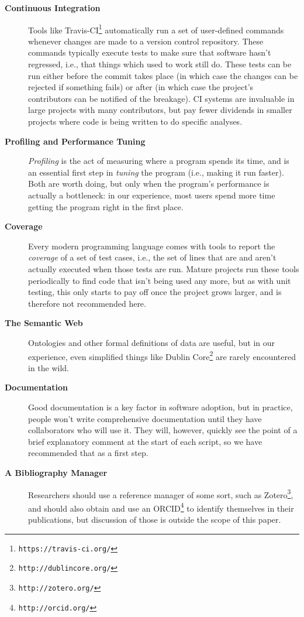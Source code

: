 \documentclass[10pt]{article}
\newcommand{\withurl}[2]{{#1}\footnote{\texttt{#2}}}
\begin{document}
\begin{description}
\item[\textbf{Continuous Integration}] Tools like
  \withurl{Travis-CI}{https://travis-ci.org/} automatically run a set of
  user-defined commands whenever changes are made to a version control
  repository. These commands typically execute tests to make sure that
  software hasn't regressed, i.e., that things which used to work
  still do. These tests can be run either before the commit takes
  place (in which case the changes can be rejected if something fails)
  or after (in which case the project's contributors can be notified
  of the breakage). CI systems are invaluable in large projects with
  many contributors, but pay fewer dividends in smaller projects where
  code is being written to do specific analyses.

\item[\textbf{Profiling and Performance Tuning}]
  \emph{Profiling} is the act of measuring where a program spends its
  time, and is an essential first step in \emph{tuning} the program
  (i.e., making it run faster). Both are worth doing, but only when
  the program's performance is actually a bottleneck: in our
  experience, most users spend more time getting the program right in
  the first place.

\item[\textbf{Coverage}]
  Every modern programming language comes with tools to report the
  \emph{coverage} of a set of test cases, i.e., the set of lines that
  are and aren't actually executed when those tests are run. Mature
  projects run these tools periodically to find code that isn't being
  used any more, but as with unit testing, this only starts to pay off
  once the project grows larger, and is therefore not recommended
  here.

\item[\textbf{The Semantic Web}]
  Ontologies and other formal definitions of data are useful, but in
  our experience, even simplified things like \withurl{Dublin
    Core}{http://dublincore.org/} are rarely encountered in the wild.

\item[\textbf{Documentation}]
  Good documentation is a key factor in software adoption, but in
  practice, people won't write comprehensive documentation until they
  have collaborators who will use it. They will, however, quickly see
  the point of a brief explanatory comment at the start of each
  script, so we have recommended that as a first step.

\item[\textbf{A Bibliography Manager}] Researchers should use a
  reference manager of some sort, such as
  \withurl{Zotero}{http://zotero.org/}, and should also obtain and use an
  \withurl{ORCID}{http://orcid.org/} to identify themselves in their
  publications, but discussion of those is outside the scope of this
  paper.


\end{description}
\end{document}

